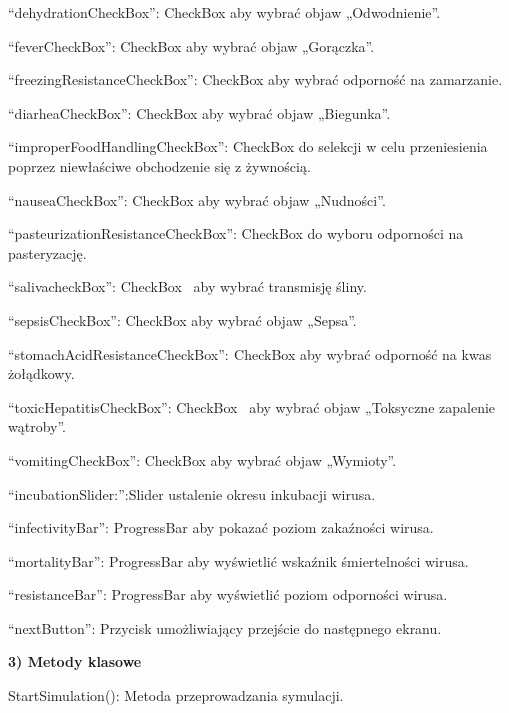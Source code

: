 \documentclass[a4paper]{article}
\begin{document}
\foreignlanguage{polish}{“dehydrationCheckBox”: CheckBox aby wybrać objaw „Odwodnienie”.}

\foreignlanguage{polish}{“feverCheckBox”: CheckBox aby wybrać objaw „Gorączka”.}

\foreignlanguage{polish}{“freezingResistanceCheckBox”: CheckBox aby wybrać odporność na zamarzanie.}

\foreignlanguage{polish}{“diarheaCheckBox”: CheckBox aby wybrać objaw „Biegunka”.}


\foreignlanguage{polish}{“improperFoodHandlingCheckBox”: CheckBox do selekcji w celu przeniesienia poprzez niewłaściwe
obchodzenie się z żywnością.}

\foreignlanguage{polish}{“nauseaCheckBox”: CheckBox aby wybrać objaw „Nudności”.}

\foreignlanguage{polish}{“pasteurizationResistanceCheckBox”: CheckBox do wyboru odporności na pasteryzację.}

\foreignlanguage{polish}{“salivacheckBox”: CheckBox \ aby wybrać transmisję śliny.}

\foreignlanguage{polish}{“sepsisCheckBox”: CheckBox aby wybrać objaw „Sepsa”.}

\foreignlanguage{polish}{“stomachAcidResistanceCheckBox”:}\foreignlanguage{polish}{\textbf{\textcolor{black}{
}}}\foreignlanguage{polish}{CheckBox aby wybrać odporność na kwas żołądkowy.}

\foreignlanguage{polish}{“toxicHepatitisCheckBox”: CheckBox \ aby wybrać objaw „Toksyczne zapalenie wątroby”.}

\foreignlanguage{polish}{“vomitingCheckBox”: CheckBox aby wybrać objaw „Wymioty”.}

\foreignlanguage{polish}{“incubationSlider:”:Slider ustalenie okresu inkubacji wirusa.}

\foreignlanguage{polish}{“infectivityBar”: ProgressBar aby pokazać poziom zakaźności wirusa.}

\foreignlanguage{polish}{“mortalityBar”: ProgressBar aby wyświetlić wskaźnik śmiertelności wirusa.}

\foreignlanguage{polish}{“resistanceBar”: ProgressBar aby wyświetlić poziom odporności wirusa.}

\foreignlanguage{polish}{“nextButton”: Przycisk umożliwiający przejście do następnego ekranu.}


\bigskip

\foreignlanguage{polish}{\textbf{3) Metody klasowe}}

\foreignlanguage{polish}{StartSimulation(): Metoda przeprowadzania symulacji.}
\end{document}
